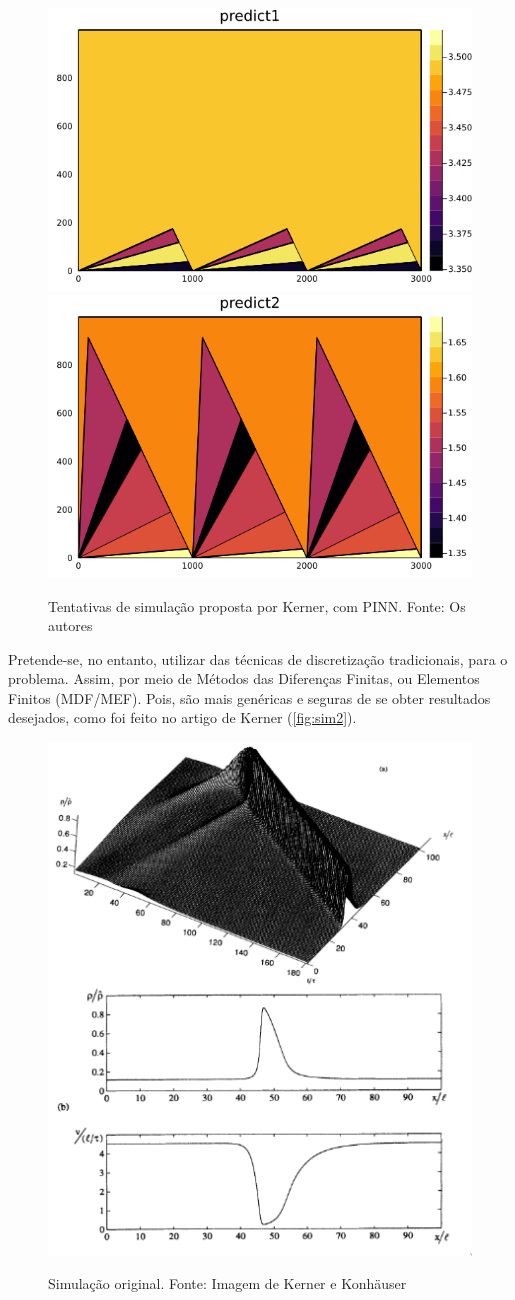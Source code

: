 \documentclass[12pt, brazilian]{article}
\begin{document}
\begin{figure}[ht]
  \centering
  \caption{\label{fig:sim1} Tentativas de simulação proposta por Kerner, com PINN. Fonte: Os autores}
  \includegraphics[width=0.45\linewidth]{../img/sol_variable_corrected_bcs31.png}
  \includegraphics[width=0.45\linewidth]{../img/sol_variable_corrected_bcs32.png}
  \\ %
\end{figure}

Pretende-se, no entanto, utilizar das técnicas de discretização tradicionais, para o problema. Assim, por meio de Métodos das Diferenças Finitas, ou Elementos Finitos (MDF/MEF). Pois, são mais genéricas e seguras de se obter resultados desejados, como foi feito no artigo de Kerner (\autoref{fig:sim2}).

\begin{figure}[ht]
  \centering
  \caption{\label{fig:sim2} Simulação original. Fonte: Imagem de Kerner e Konhäuser \cite{kerner1993cluster}}
  \includegraphics[width=0.4\linewidth]{./kerner.png}
  \\  %
\end{figure}


\clearpage


\end{document}
